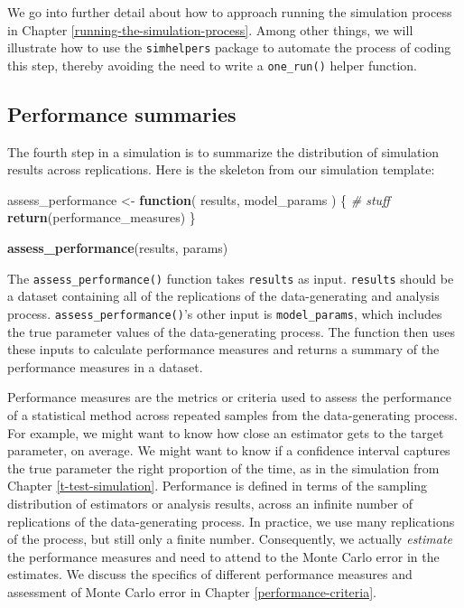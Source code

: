 \documentclass[
]{book}
\newenvironment{Shaded}{\begin{snugshade}}{\end{snugshade}}
\newcommand{\CommentTok}[1]{\textcolor[rgb]{0.56,0.35,0.01}{\textit{#1}}}
\newcommand{\ControlFlowTok}[1]{\textcolor[rgb]{0.13,0.29,0.53}{\textbf{#1}}}
\newcommand{\FunctionTok}[1]{\textcolor[rgb]{0.13,0.29,0.53}{\textbf{#1}}}
\newcommand{\NormalTok}[1]{#1}
\newcommand{\OtherTok}[1]{\textcolor[rgb]{0.56,0.35,0.01}{#1}}
\begin{document}
We go into further detail about how to approach running the simulation process in Chapter \ref{running-the-simulation-process}.
Among other things, we will illustrate how to use the \texttt{simhelpers} package to automate the process of coding this step, thereby avoiding the need to write a \texttt{one\_run()} helper function.

\subsection{Performance summaries}\label{performance-summaries}

The fourth step in a simulation is to summarize the distribution of simulation results across replications.
Here is the skeleton from our simulation template:

\begin{Shaded}
\begin{Highlighting}[]
\NormalTok{assess\_performance }\OtherTok{\textless{}{-}} \ControlFlowTok{function}\NormalTok{( results, model\_params ) \{}
  \CommentTok{\# stuff}
  \FunctionTok{return}\NormalTok{(performance\_measures)}
\NormalTok{\}}

\FunctionTok{assess\_performance}\NormalTok{(results, params)}
\end{Highlighting}
\end{Shaded}

The \texttt{assess\_performance()} function takes \texttt{results} as input.
\texttt{results} should be a dataset containing all of the replications of the data-generating and analysis process.
\texttt{assess\_performance()}'s other input is \texttt{model\_params}, which includes the true parameter values of the data-generating process.
The function then uses these inputs to calculate performance measures and returns a summary of the performance measures in a dataset.

Performance measures are the metrics or criteria used to assess the performance of a statistical method across repeated samples from the data-generating process.
For example, we might want to know how close an estimator gets to the target parameter, on average.
We might want to know if a confidence interval captures the true parameter the right proportion of the time, as in the simulation from Chapter \ref{t-test-simulation}.
Performance is defined in terms of the sampling distribution of estimators or analysis results, across an infinite number of replications of the data-generating process.
In practice, we use many replications of the process, but still only a finite number. Consequently, we actually \emph{estimate} the performance measures and need to attend to the Monte Carlo error in the estimates.
We discuss the specifics of different performance measures and assessment of Monte Carlo error in Chapter \ref{performance-criteria}.
\end{document}

